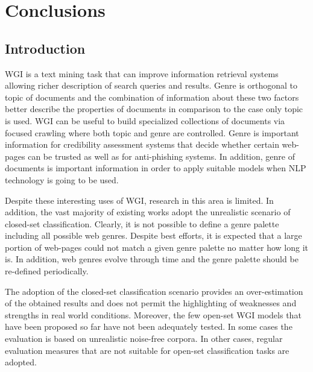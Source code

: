 
\chapter{Conclusions}

\label{chap:conclusions}


\newcommand{\keyword}[1]{\textbf{#1}}
\newcommand{\tabhead}[1]{\textbf{#1}}
\newcommand{\code}[1]{\texttt{#1}}
\newcommand{\file}[1]{\texttt{\bfseries#1}}
\newcommand{\option}[1]{\texttt{\itshape#1}}


\section{Introduction}

WGI is a text mining task that can improve information retrieval systems allowing richer description of search queries and results. Genre is orthogonal to topic of documents and the combination of information about these two factors better describe the properties of documents in comparison to the case only topic is used. WGI can be useful to build specialized collections of documents via focused crawling where both topic and genre are controlled. Genre is important information for credibility assessment systems that decide whether certain web-pages can be trusted as well as for anti-phishing systems. In addition, genre of documents is important information in order to apply suitable models when NLP technology is going to be used.

Despite these interesting uses of WGI, research in this area is limited. In addition, the vast majority of existing works adopt the unrealistic scenario of closed-set classification. Clearly, it is not possible to define a genre palette including all possible web genres. Despite best efforts, it is expected that a large portion of web-pages could not match a given genre palette no matter how long it is. In addition, web genres evolve through time and the genre palette should be re-defined periodically.

The adoption of the closed-set classification scenario provides an over-estimation of the obtained results and does not permit the highlighting of weaknesses and strengths in real world conditions. Moreover, the few open-set WGI models that have been proposed so far have not been adequately tested. In some cases the evaluation is based on unrealistic noise-free corpora. In other cases, regular evaluation measures that are not suitable for open-set classification tasks are adopted. 

